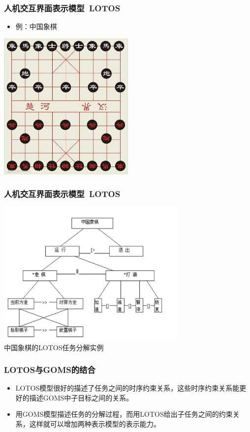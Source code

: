 \documentclass{beamer}
\begin{document}
\begin{frame}
	\frametitle{人机交互界面表示模型~{\small LOTOS}}
	\begin{itemize}
		\item 例：中国象棋
	\end{itemize}
	\begin{center}
	\includegraphics[width=0.5\textwidth]{images/chinese-chess.jpg}
	\end{center}
\end{frame}

\begin{frame}
	\frametitle{人机交互界面表示模型~{\small LOTOS}}
	\begin{center}
	\includegraphics[width=0.7\textwidth]{images/chinese-chess-lotos.png}\\
	{\tiny 中国象棋的LOTOS任务分解实例}
	\end{center}
\end{frame}

\begin{frame}
	\frametitle{LOTOS与GOMS的结合}
	\beamertemplatetransparentcovereddynamicmedium
	\begin{itemize}[<+->]
		\item LOTOS模型很好的描述了任务之间的时序约束关系，这些时序约束关系能更好的描述GOMS中子目标之间的关系。
		\item 用GOMS模型描述任务的分解过程，而用LOTOS给出子任务之间的约束关系，这样就可以增加两种表示模型的表示能力。 
	\end{itemize}
\end{frame}
\end{document}
